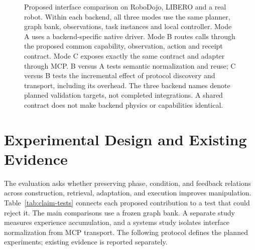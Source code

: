 \documentclass[10pt,twocolumn,letterpaper]{article}
\begin{document}
\begin{figure}[t]
{{}
}
\caption{Proposed interface comparison on RoboDojo, LIBERO and a real robot. Within each backend, all three modes use the same planner, graph bank, observations, task instances and local controller. Mode A uses a backend-specific native driver. Mode B routes calls through the proposed common capability, observation, action and receipt contract. Mode C exposes exactly the same contract and adapter through MCP. B versus A tests semantic normalization and reuse; C versus B tests the incremental effect of protocol discovery and transport, including its overhead. The three backend names denote planned validation targets, not completed integrations. A shared contract does not make backend physics or capabilities identical.}
\label{fig:platform}
\end{figure}


\section{Experimental Design and Existing Evidence}
\label{sec:experiments}

The evaluation asks whether preserving phase, condition, and feedback relations across construction, retrieval, adaptation, and execution improves manipulation. Table~\ref{tab:claim-tests} connects each proposed contribution to a test that could reject it. The main comparisons use a frozen graph bank. A separate study measures experience accumulation, and a systems study isolates interface normalization from MCP transport. The following protocol defines the planned experiments; existing evidence is reported separately.
\end{document}
